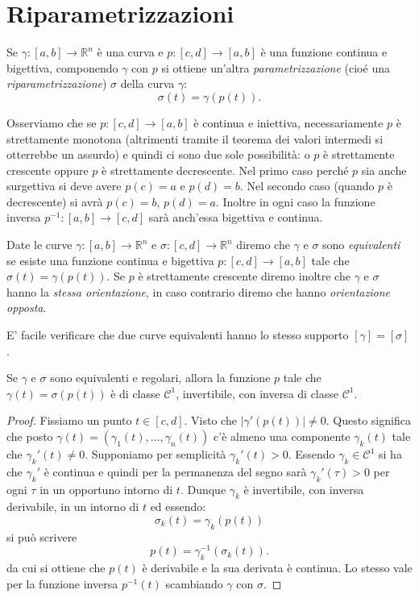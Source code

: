 \documentclass[italian,a4paper,hidelinks]{scrartcl}
\newcommand{\RR}{{\mathbb R}}
\newcommand{\C}{{\mathcal C}}
\begin{document}
\section{Riparametrizzazioni}

Se $\gamma\colon [a,b]\to \RR^n$ è una curva e $p\colon [c,d]\to
[a,b]$ è una funzione continua e bigettiva, componendo $\gamma$ con
$p$ si ottiene un'altra \emph{parametrizzazione}
(cioé una
\emph{riparametrizzazione}) $\sigma$ della curva
$\gamma$:
\[
\sigma(t) = \gamma(p(t)).
\]

Osserviamo che se $p\colon [c,d] \to [a,b]$ è continua e iniettiva,
necessariamente $p$ è strettamente monotona (altrimenti tramite il
teorema dei valori intermedi si otterrebbe un assurdo) e quindi ci
sono due sole possibilità: o $p$ è strettamente crescente oppure $p$ è
strettamente decrescente. Nel primo caso perché $p$ sia anche
surgettiva si deve avere $p(c)=a$ e $p(d)=b$. Nel secondo caso (quando
$p$ è decrescente) si avrà $p(c) = b$, $p(d) = a$. Inoltre in ogni
caso la funzione inversa $p^{-1}\colon [a,b] \to [c,d]$ sarà anch'essa
bigettiva e continua.

Date le curve $\gamma\colon [a,b]\to \RR^n$ e $\sigma\colon[c,d] \to
\RR^n$ diremo che $\gamma$ e $\sigma$ sono \emph{equivalenti} se
esiste una funzione continua e bigettiva $p\colon[c,d]\to [a,b]$ tale
che $\sigma(t) = \gamma(p(t))$. Se $p$ è strettamente crescente diremo
inoltre che $\gamma$ e $\sigma$ hanno la
\emph{stessa orientazione},
in caso contrario diremo che hanno \emph{orientazione opposta}.

E' facile verificare che due curve equivalenti hanno lo stesso supporto $[\gamma] =
[\sigma]$.

\begin{lemma}
Se $\gamma$ e $\sigma$ sono equivalenti e regolari, allora la funzione
$p$ tale che $\gamma(t) = \sigma(p(t))$ è di classe $\C^1$,
invertibile, con inversa di classe $\C^1$.
\end{lemma}

\begin{proof}
Fissiamo un punto $t\in [c,d]$. Visto che $\lvert \gamma'(p(t))\rvert
\neq 0$. Questo significa che posto $\gamma(t) =
(\gamma_1(t),\dots,\gamma_n(t))$ c'è almeno una componente
$\gamma_k(t)$ tale che $\gamma_k'(t)\neq 0$. Supponiamo per semplicità
$\gamma_k'(t)>0$. Essendo $\gamma_k\in \C^1$ si ha che $\gamma_k'$ è
continua e quindi per la permanenza del segno sarà $\gamma_k'(\tau)
>0$
per ogni $\tau$ in un opportuno intorno di $t$. Dunque $\gamma_k$ è
invertibile, con inversa derivabile, in un intorno di $t$ ed essendo:
\[
  \sigma_k(t) = \gamma_k(p(t))
\]
si può scrivere
\[
  p(t) = \gamma_k^{-1}(\sigma_k(t)).
\]
da cui si ottiene che $p(t)$ è derivabile e la sua derivata è
continua. Lo stesso vale per la funzione inversa $p^{-1}(t)$
scambiando $\gamma$ con $\sigma$.
\end{proof}
\end{document}

